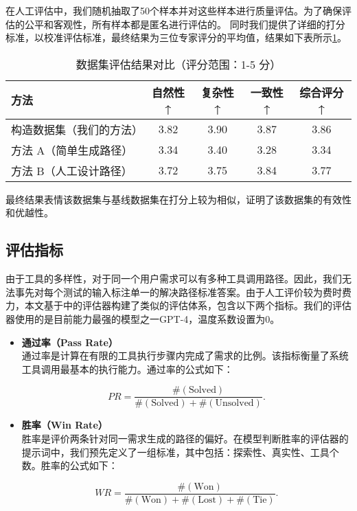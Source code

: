 在人工评估中，我们随机抽取了50个样本并对这些样本进行质量评估。为了确保评估的公平和客观性，所有样本都是匿名进行评估的。
同时我们提供了详细的打分标准，以校准评估标准，最终结果为三位专家评分的平均值，结果如下表所示\ref{tab:comparison}。

\begin{table}[h]
  \centering
  \caption{数据集评估结果对比（评分范围：1-5 分）}
  \label{tab:comparison}
  \begin{tabular}{l|c|c|c|c}
  \toprule
  \textbf{方法}               & \textbf{自然性↑} & \textbf{复杂性↑} & \textbf{一致性↑} & \textbf{综合评分↑} \\ \midrule
  构造数据集（我们的方法）   & 3.82             & 3.90             & 3.87             & 3.86              \\ \hline
  方法 A（简单生成路径）      & 3.34             & 3.40             & 3.28             & 3.34              \\ \hline
  方法 B（人工设计路径）      & 3.72             & 3.75             & 3.84             & 3.77              \\ 
  \bottomrule
  \end{tabular}
\end{table}

最终结果表情该数据集与基线数据集在打分上较为相似，证明了该数据集的有效性和优越性。

\subsection{评估指标}
由于工具的多样性，对于同一个用户需求可以有多种工具调用路径。因此，我们无法事先对每个测试的输入标注单一的解决路径标准答案。由于人工评价较为费时费力，本文基于\cite{Tang2023}中的评估器构建了类似的评估体系，包含以下两个指标。我们的评估器使用的是目前能力最强的模型之一GPT-4，温度系数设置为0。

\begin{itemize}
    \item \textbf{通过率（Pass Rate）} \\
    通过率是计算在有限的工具执行步骤内完成了需求的比例。该指标衡量了系统工具调用最基本的执行能力。通过率的公式如下：

    \begin{equation}
        PR = \frac{ \#(\text{Solved}) }{ \#(\text{Solved}) + \#(\text{Unsolved}) }.
    \end{equation}

    \item \textbf{胜率（Win Rate）} \\
    胜率是评价两条针对同一需求生成的路径的偏好。在模型判断胜率的评估器的提示词中，我们预先定义了一组标准，其中包括：探索性、真实性、工具个数。胜率的公式如下：

    \begin{equation}
        WR = \frac{ \#(\text{Won}) }{ \#(\text{Won}) + \#(\text{Lost}) + \#(\text{Tie}) }.
    \end{equation}

\end{itemize}

